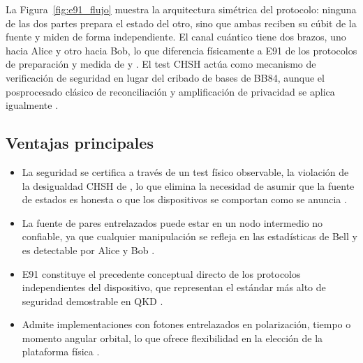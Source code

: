 La Figura~\ref{fig:e91_flujo} muestra la arquitectura simétrica del protocolo: ninguna de las dos partes prepara el estado del otro, sino que ambas reciben su cúbit de la fuente y miden de forma independiente. El canal cuántico tiene dos brazos, uno hacia Alice y otro hacia Bob, lo que diferencia físicamente a E91 de los protocolos de preparación y medida de \cite{bennett1984} y \cite{bennett1992}. El test CHSH actúa como mecanismo de verificación de seguridad en lugar del cribado de bases de BB84, aunque el posprocesado clásico de reconciliación y amplificación de privacidad se aplica igualmente \citep{brassard1994,bennett1995,scarani2009}.

\subsection{Ventajas principales}
\begin{itemize}
    \item La seguridad se certifica a través de un test físico observable, la violación de la desigualdad CHSH de \cite{clauser1969}, lo que elimina la necesidad de asumir que la fuente de estados es honesta o que los dispositivos se comportan como se anuncia \citep{ekert1991,acin2007}.
    \item La fuente de pares entrelazados puede estar en un nodo intermedio no confiable, ya que cualquier manipulación se refleja en las estadísticas de Bell y es detectable por Alice y Bob \citep{gisin2002,scarani2009}.
    \item E91 constituye el precedente conceptual directo de los protocolos independientes del dispositivo, que representan el estándar más alto de seguridad demostrable en QKD \citep{acin2007,scarani2009}.
    \item Admite implementaciones con fotones entrelazados en polarización, tiempo o momento angular orbital, lo que ofrece flexibilidad en la elección de la plataforma física \citep{gisin2002}.
\end{itemize}

